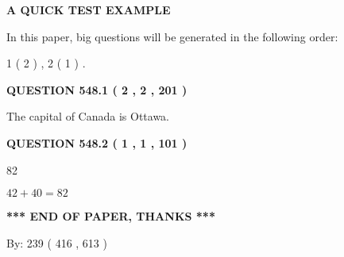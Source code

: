 \documentclass[12pt]{article}
\begin{document}
   
\vspace{0.2in}
   
   
   
   
   
   
 \vspace{0.2in}
{\LARGE {\textbf{ A QUICK TEST EXAMPLE}}}
   
   
   
\vspace{0.2in}
   
In this paper, big questions will be generated in the following order: 
   
   
   1 ( 2 )
 ,
   2 ( 1 )
 .
  
\vspace{0.2in}
  
{\textbf{\Large{QUESTION
548.1 
 ( 2 , 2 , 201 )
}}}
  
  
 
 
\noindent{}
 
 
The capital of Canada is Ottawa.
 
 
 
 
  
\vspace{0.2in}
  
{\textbf{\Large{QUESTION
548.2 
 ( 1 , 1 , 101 )
}}}
  
  
 
 
\noindent{}

82
 
 
 
 
\noindent{}

$ %
42 +  %
40=   %
82$
 
 
   
   
 \vspace{0.2in}
 
   
   
   
   
\vspace{1.0in} 
{\textbf{\large{ *** END OF PAPER, THANKS *** }}} 
   
   
\hspace{1.0in} By: 
 239 ( 416 ,  613 )
   
   
   
\end{document}
